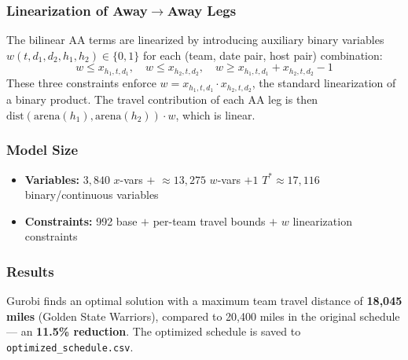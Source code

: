 \documentclass[11pt, letterpaper]{article}
\begin{document}
\subsubsection*{Linearization of Away$\to$Away Legs}

The bilinear AA terms are linearized by introducing auxiliary binary variables
$w(t, d_1, d_2, h_1, h_2) \in \{0,1\}$ for each (team, date pair, host pair)
combination:
\[
  w \leq x_{h_1,t,d_1}, \quad w \leq x_{h_2,t,d_2}, \quad w \geq x_{h_1,t,d_1} + x_{h_2,t,d_2} - 1
\]
These three constraints enforce $w = x_{h_1,t,d_1} \cdot x_{h_2,t,d_2}$, the
standard linearization of a binary product. The travel contribution of each AA
leg is then $\mathrm{dist}(\mathrm{arena}(h_1), \mathrm{arena}(h_2)) \cdot w$, which is linear.

\subsubsection*{Model Size}

\begin{itemize}[nosep]
  \item \textbf{Variables:} $3{,}840$ $x$-vars $+$ $\approx 13{,}275$ $w$-vars $+ 1$ $T^* \approx 17{,}116$ binary/continuous variables
  \item \textbf{Constraints:} 992 base $+$ per-team travel bounds $+$ $w$ linearization constraints
\end{itemize}

\subsubsection*{Results}

Gurobi finds an optimal solution with a maximum team travel distance of
\textbf{18,045 miles} (Golden State Warriors), compared to 20,400 miles in the
original schedule --- an \textbf{11.5\% reduction}. The optimized schedule is
saved to \texttt{optimized\_schedule.csv}.
\end{document}
